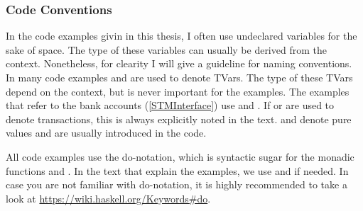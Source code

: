 \subsubsection{Code Conventions}
In the code examples givin in this thesis, I often use undeclared variables for the sake of space.
The type of these variables can usually be derived from the context. Nonetheless, for 
clearity I will give a guideline for naming conventions. In many code examples  and  
are used to denote TVars. The type of these TVars depend on the context, but is never important for the
examples. The examples that refer to the bank accounts (\ref{STMInterface}) use  and 
. If  or  are used to denote transactions, this is always explicitly 
noted in the text.  and  denote pure values and are usually introduced in the code.

All code examples use the do-notation, which is syntactic sugar for the monadic functions \code{>>=} and 
\code{>>}. In the text that explain the examples, we use \code{>>=} and \code{>>} if needed.
In case you are not familiar with do-notation, it is highly recommended to take a look at 
\url{https://wiki.haskell.org/Keywords#do}.
